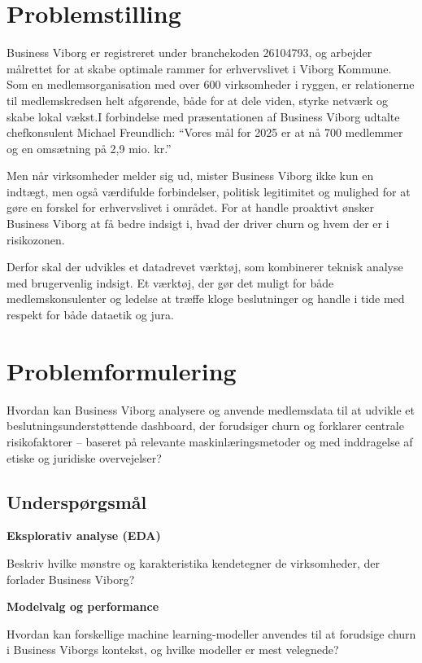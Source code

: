 \documentclass[
  11pt,
  letterpaper,
  DIV=11,
  numbers=noendperiod]{scrartcl}
\begin{document}
\section{Problemstilling}\label{problemstilling}

Business Viborg er registreret under branchekoden 26104793, og arbejder
målrettet for at skabe optimale rammer for erhvervslivet i Viborg
Kommune. Som en medlemsorganisation med over 600 virksomheder i ryggen,
er relationerne til medlemskredsen helt afgørende, både for at dele
viden, styrke netværk og skabe lokal vækst.I forbindelse med
præsentationen af Business Viborg udtalte chefkonsulent Michael
Freundlich: ``Vores mål for 2025 er at nå 700 medlemmer og en omsætning
på 2,9 mio. kr.''

Men når virksomheder melder sig ud, mister Business Viborg ikke kun en
indtægt, men også værdifulde forbindelser, politisk legitimitet og
mulighed for at gøre en forskel for erhvervslivet i området. For at
handle proaktivt ønsker Business Viborg at få bedre indsigt i, hvad der
driver churn og hvem der er i risikozonen.

Derfor skal der udvikles et datadrevet værktøj, som kombinerer teknisk
analyse med brugervenlig indsigt. Et værktøj, der gør det muligt for
både medlemskonsulenter og ledelse at træffe kloge beslutninger og
handle i tide med respekt for både dataetik og jura.

\section{Problemformulering}\label{problemformulering}

Hvordan kan Business Viborg analysere og anvende medlemsdata til at
udvikle et beslutningsunderstøttende dashboard, der forudsiger churn og
forklarer centrale risikofaktorer -- baseret på relevante
maskinlæringsmetoder og med inddragelse af etiske og juridiske
overvejelser?

\subsection{Underspørgsmål}\label{underspuxf8rgsmuxe5l}

\textbf{Eksplorativ analyse (EDA)}

Beskriv hvilke mønstre og karakteristika kendetegner de virksomheder,
der forlader Business Viborg?

\textbf{Modelvalg og performance}

Hvordan kan forskellige machine learning-modeller anvendes til at
forudsige churn i Business Viborgs kontekst, og hvilke modeller er mest
velegnede?
\end{document}
